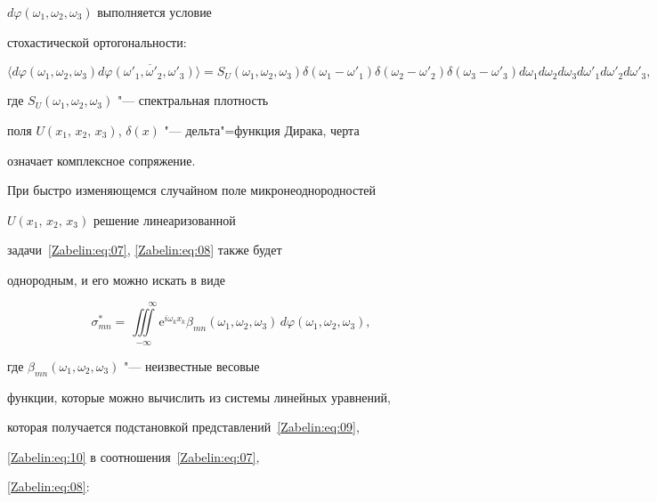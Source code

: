 $d\varphi(\omega_1,\omega_2,\omega_3)$ выполняется условие

стохастической ортогональности:

$$

\langle

d\varphi(\omega_1,\omega_2,\omega_3)d\overline{\varphi(\omega'_1,\omega'_2,\omega'_3)}\rangle=

S_U(\omega_1,\omega_2,\omega_3)\delta(\omega_1-\omega'_1)\delta(\omega_2-\omega'_2)\delta(\omega_3-\omega'_3)

d\omega_1d\omega_2d\omega_3d\omega'_1d\omega'_2d\omega'_3,

$$

где $S_U(\omega_1,\omega_2,\omega_3)$ "--- спектральная плотность

поля $U(x_1,\, x_2,\, x_3)$, $\delta(x)$ "--- дельта"=функция Дирака, черта

означает комплексное сопряжение.



При быстро изменяющемся случайном поле микронеоднородностей

$U(x_1,\, x_2,\, x_3)$ решение линеаризованной

задачи~\eqref{Zabelin:eq:07}, \eqref{Zabelin:eq:08} также будет

однородным, и его можно искать в виде

\begin{equation}\label{Zabelin:eq:10}

\sigma_{mn}^*=\iiint\limits_{-\infty}^{\phantom{--}\infty}\mathrm{e}^{i\omega_kx_k}

\beta_{mn}(\omega_1,\omega_2,\omega_3)\,d\varphi(\omega_1,\omega_2,\omega_3),

\end{equation}

где $\beta_{mn}(\omega_1,\omega_2,\omega_3)$ "--- неизвестные весовые

функции, которые можно вычислить из системы линейных уравнений,

которая получается подстановкой представлений~\eqref{Zabelin:eq:09},

\eqref{Zabelin:eq:10} в соотношения~\eqref{Zabelin:eq:07},

\eqref{Zabelin:eq:08}:



